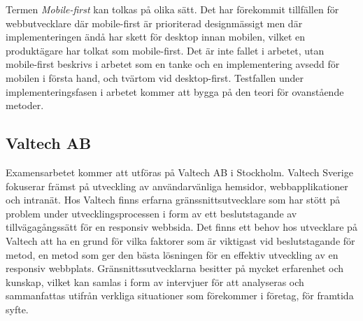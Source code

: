 \documentclass[11pt]{article}
\begin{document}
Termen \textit{Mobile-first} kan tolkas på olika sätt. Det har förekommit tillfällen för webbutvecklare där mobile-first är prioriterad designmässigt men där implementeringen ändå har skett för desktop innan mobilen, vilket en produktägare har tolkat som mobile-first. Det är inte\cite[p.~40]{GoodParts} fallet i arbetet, utan mobile-first beskrivs i arbetet som en tanke och en implementering avsedd för mobilen i första hand, och tvärtom vid desktop-first. Testfallen under implementeringsfasen i arbetet kommer att bygga på den teori för ovanstående metoder.

\newpage

\subsection{Valtech AB}
Examensarbetet kommer att utföras på Valtech AB i Stockholm. Valtech Sverige fokuserar främst på utveckling av användarvänliga hemsidor, webbapplikationer och intranät. Hos Valtech finns erfarna gränssnittsutvecklare som har stött på problem under utvecklingsprocessen i form av ett beslutstagande av tillvägagångssätt för en responsiv webbsida. Det finns ett behov hos utvecklare på Valtech att ha en grund för vilka faktorer som är viktigast vid beslutstagande för metod, en metod som ger den bästa lösningen för en effektiv utveckling av en responsiv webbplats. Gränsnittssutvecklarna besitter på mycket erfarenhet och kunskap, vilket kan samlas i form av intervjuer för att analyseras och sammanfattas utifrån verkliga situationer som förekommer i företag, för framtida syfte.

\nocite{Tddjs}
\printbibliography
\end{document}
